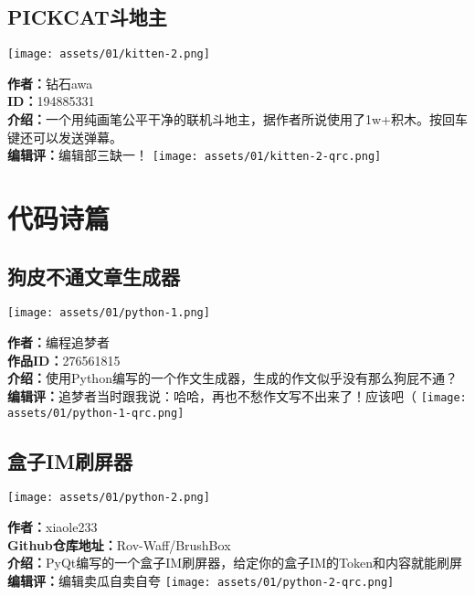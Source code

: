 \documentclass[UTF8,fontset=fandol]{article}
\begin{document}
\subsection{PICKCAT斗地主}
\texttt{[image: assets/01/kitten-2.png]}

\noindent
\textbf{作者：}钻石awa \\
\textbf{ID：}194885331 \\
\textbf{介绍：}一个用纯画笔公平干净的联机斗地主，据作者所说使用了1w+积木。按回车键还可以发送弹幕。\\
\textbf{编辑评：}编辑部三缺一！
\hfill\texttt{[image: assets/01/kitten-2-qrc.png]}

\pagebreak
\section{代码诗篇}
\subsection{狗皮不通文章生成器}
\texttt{[image: assets/01/python-1.png]}

\noindent
\textbf{作者：}编程追梦者 \\
\textbf{作品ID：}276561815 \\
\textbf{介绍：}使用Python编写的一个作文生成器，生成的作文似乎没有那么狗屁不通？\\
\textbf{编辑评：}追梦者当时跟我说：哈哈，再也不愁作文写不出来了！应该吧（
\hfill \texttt{[image: assets/01/python-1-qrc.png]}

\subsection{盒子IM刷屏器}
\texttt{[image: assets/01/python-2.png]}

\noindent
\textbf{作者：}xiaole233 \\
\textbf{Github仓库地址：}Rov-Waff/BrushBox \\
\textbf{介绍：}PyQt编写的一个盒子IM刷屏器，给定你的盒子IM的Token和内容就能刷屏\\
\textbf{编辑评：}编辑卖瓜自卖自夸
\hfill \texttt{[image: assets/01/python-2-qrc.png]}
\end{document}
